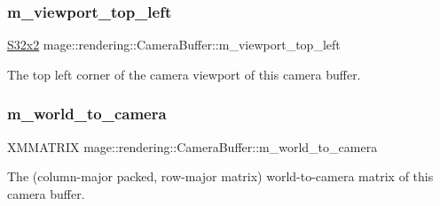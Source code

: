 \subsubsection{\texorpdfstring{m\+\_\+viewport\+\_\+top\+\_\+left}{m\_viewport\_top\_left}}
{\footnotesize\ttfamily \hyperlink{namespacemage_a02de5a44f35ee9917e5788d63795fece}{S32x2} mage\+::rendering\+::\+Camera\+Buffer\+::m\+\_\+viewport\+\_\+top\+\_\+left}

The top left corner of the camera viewport of this camera buffer. \hypertarget{structmage_1_1rendering_1_1_camera_buffer_af1ceff883dcc383ce10f2165a5a9a061}{}\label{structmage_1_1rendering_1_1_camera_buffer_af1ceff883dcc383ce10f2165a5a9a061} 
\subsubsection{\texorpdfstring{m\+\_\+world\+\_\+to\+\_\+camera}{m\_world\_to\_camera}}
{\footnotesize\ttfamily X\+M\+M\+A\+T\+R\+IX mage\+::rendering\+::\+Camera\+Buffer\+::m\+\_\+world\+\_\+to\+\_\+camera}

The (column-\/major packed, row-\/major matrix) world-\/to-\/camera matrix of this camera buffer. 